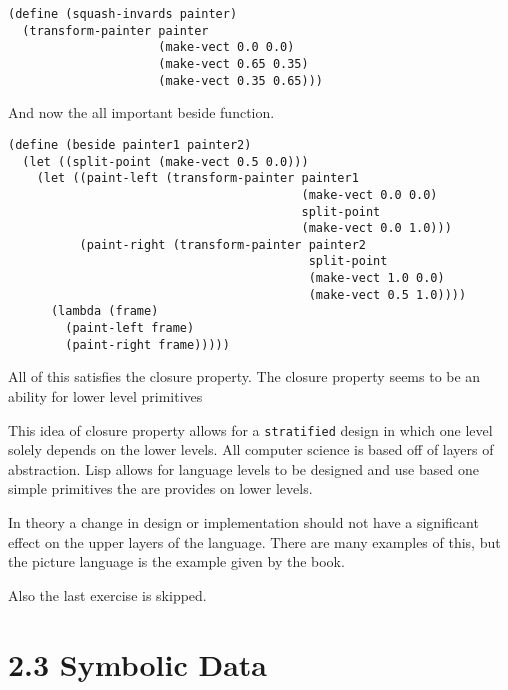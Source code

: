 \documentclass[11pt]{article}
\begin{document}
\begin{enumerate}
\begin{verbatim}
(define (squash-invards painter)
  (transform-painter painter
                     (make-vect 0.0 0.0)
                     (make-vect 0.65 0.35)
                     (make-vect 0.35 0.65)))
\end{verbatim}

And now the all important beside function.

\begin{verbatim}
(define (beside painter1 painter2)
  (let ((split-point (make-vect 0.5 0.0)))
    (let ((paint-left (transform-painter painter1
                                         (make-vect 0.0 0.0)
                                         split-point
                                         (make-vect 0.0 1.0)))
          (paint-right (transform-painter painter2
                                          split-point
                                          (make-vect 1.0 0.0)
                                          (make-vect 0.5 1.0))))
      (lambda (frame)
        (paint-left frame)
        (paint-right frame)))))
\end{verbatim}

All of this satisfies the closure property. The closure property seems
to be an ability for lower level primitives

This idea of closure property allows for a \texttt{stratified} design in which
one level solely depends on the lower levels. All computer science is
based off of layers of abstraction. Lisp allows for language levels to
be designed and use based one simple primitives the are provides on
lower levels.

In theory a change in design or implementation should not have a
significant effect on the upper layers of the language. There are many
examples of this, but the picture language is the example given by the
book.

Also the last exercise is skipped.
\end{enumerate}

\section{2.3 Symbolic Data}
\label{sec:org474e67f}
\end{document}
